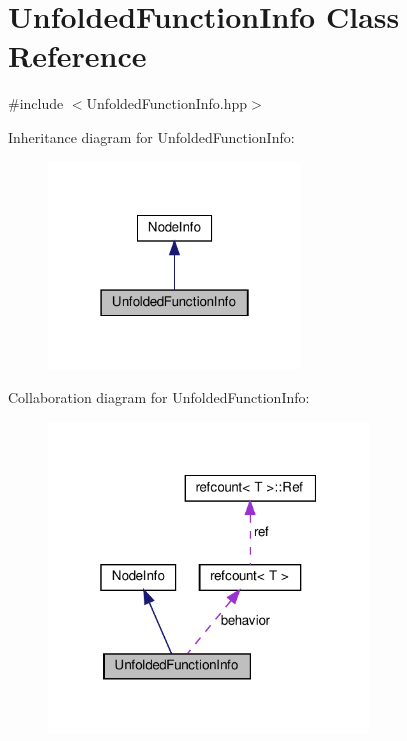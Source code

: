 \hypertarget{classUnfoldedFunctionInfo}{}\section{Unfolded\+Function\+Info Class Reference}
\label{classUnfoldedFunctionInfo}


{\ttfamily \#include $<$Unfolded\+Function\+Info.\+hpp$>$}



Inheritance diagram for Unfolded\+Function\+Info\+:
\nopagebreak
\begin{figure}[H]
\begin{center}
\leavevmode
\includegraphics[width=190pt]{df/dba/classUnfoldedFunctionInfo__inherit__graph}
\end{center}
\end{figure}


Collaboration diagram for Unfolded\+Function\+Info\+:
\nopagebreak
\begin{figure}[H]
\begin{center}
\leavevmode
\includegraphics[width=241pt]{df/d2b/classUnfoldedFunctionInfo__coll__graph}
\end{center}
\end{figure}
